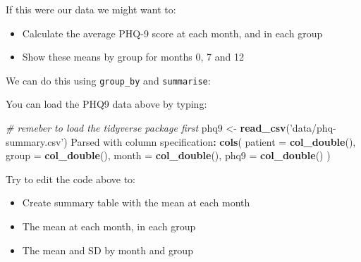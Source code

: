 \documentclass[]{article}
\newenvironment{Shaded}{\begin{snugshade}}{\end{snugshade}}
\newcommand{\CommentTok}[1]{\textcolor[rgb]{0.56,0.35,0.01}{\textit{#1}}}
\newcommand{\DataTypeTok}[1]{\textcolor[rgb]{0.13,0.29,0.53}{#1}}
\newcommand{\DecValTok}[1]{\textcolor[rgb]{0.00,0.00,0.81}{#1}}
\newcommand{\ErrorTok}[1]{\textcolor[rgb]{0.64,0.00,0.00}{\textbf{#1}}}
\newcommand{\FloatTok}[1]{\textcolor[rgb]{0.00,0.00,0.81}{#1}}
\newcommand{\KeywordTok}[1]{\textcolor[rgb]{0.13,0.29,0.53}{\textbf{#1}}}
\newcommand{\NormalTok}[1]{#1}
\newcommand{\OperatorTok}[1]{\textcolor[rgb]{0.81,0.36,0.00}{\textbf{#1}}}
\newcommand{\StringTok}[1]{\textcolor[rgb]{0.31,0.60,0.02}{#1}}
\providecommand{\tightlist}{%
  \setlength{\itemsep}{0pt}\setlength{\parskip}{0pt}}
\begin{document}
If this were our data we might want to:

\begin{itemize}
\tightlist
\item
  Calculate the average PHQ-9 score at each month, and in each group
\item
  Show these means by group for months 0, 7 and 12
\end{itemize}

We can do this using \texttt{group\_by} and \texttt{summarise}:

\begin{Shaded}
\end{Shaded}

You can load the PHQ9 data above by typing:

\begin{Shaded}
\begin{Highlighting}[]
\CommentTok{# remeber to load the tidyverse package first}
\NormalTok{phq9 <-}\StringTok{ }\KeywordTok{read_csv}\NormalTok{(}\StringTok{'data/phq-summary.csv'}\NormalTok{)}
\NormalTok{Parsed with column specification}\OperatorTok{:}
\KeywordTok{cols}\NormalTok{(}
  \DataTypeTok{patient =} \KeywordTok{col_double}\NormalTok{(),}
  \DataTypeTok{group =} \KeywordTok{col_double}\NormalTok{(),}
  \DataTypeTok{month =} \KeywordTok{col_double}\NormalTok{(),}
  \DataTypeTok{phq9 =} \KeywordTok{col_double}\NormalTok{()}
\NormalTok{)}
\end{Highlighting}
\end{Shaded}

Try to edit the code above to:

\begin{itemize}
\tightlist
\item
  Create summary table with the mean at each month
\item
  The mean at each month, in each group
\item
  The mean and SD by month and group
\end{itemize}
\end{document}
